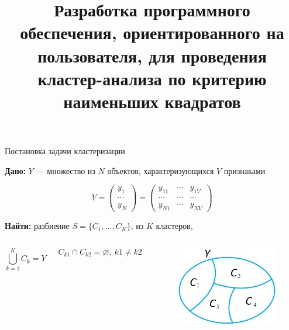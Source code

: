 \documentclass[aspectratio=169,tikz]{beamer}
\title{Разработка программного обеспечения, ориентированного на пользователя, для проведения кластер-анализа по критерию наименьших квадратов}
\author[Еремейкин П.А. \& Миркин Б.Г.]{
	\texorpdfstring{
	\begin{columns}
		\column{.45\linewidth}
		\raggedleft
		\begin{flushleft}
			Выполнил:\\
			Еремейкин Пётр Александрович\\
			студент группы мНоД16-ТМСС\\
			\href{mailto:eremeykin@gmail.com}{\texttt{eremeykin@gmail.com}}
		\end{flushleft}
		\column{.45\linewidth}
		\begin{flushright}
			Руководитель:\\
			Миркин Борис Григорьевич\\
			д.т.н. профессор\\
			\vspace*{1\baselineskip} 
		\end{flushright}
	\end{columns}
	}
	{Еремейкин \& Миркин}
}
\institute{\vspace{1cm} НИУ ВШЭ\\Июнь 2018}
\date{}
\begin{document}
	\usetikzlibrary{shapes,backgrounds}
	\usetikzlibrary{arrows.meta}
	\usetikzlibrary{snakes}
	
	\begin{frame}
		\titlepage
	\end{frame}
	
	\begin{frame}{Постановка задачи кластеризации}		
		\parbox{\linewidth}{
			\textbf{Дано: }  $ Y $ --- множество из $ N $ объектов, характеризующихся $ V $ признаками
			}
		\begin{equation*}
			Y= \begin{pmatrix} 
			y_{1} \\
			\cdots \\ 
			y_{N} 
			\end{pmatrix}
			= \begin{pmatrix} 
			y_{11} & \cdots  & y_{1V} \\ 
			\cdots & \cdots  & \cdots \\ 
			y_{N1} & \cdots  & y_{NV} 
			\end{pmatrix}
		\end{equation*}
		\parbox{\linewidth}{
			\textbf{Найти: }  разбиение $ S = \{C_1,\ldots,C_K\} $, из $ K $ кластеров,\\
			\begin{columns}
			\column{0.65\linewidth}
			\begin{equation*}
				\bigcup_{k=1}^{K}C_k=Y
			\end{equation*}
			
			\begin{equation*}
				 C_{k1} \cap C_{k2}=\varnothing ,\:k1 \neq k2
			\end{equation*}
			\column{0.35\linewidth}
			\begin{figure} %
				\centering
				\includegraphics[width=0.70\linewidth]{img/partition}
			\end{figure}
			\end{columns}
		}
	\end{frame}
\end{document}
